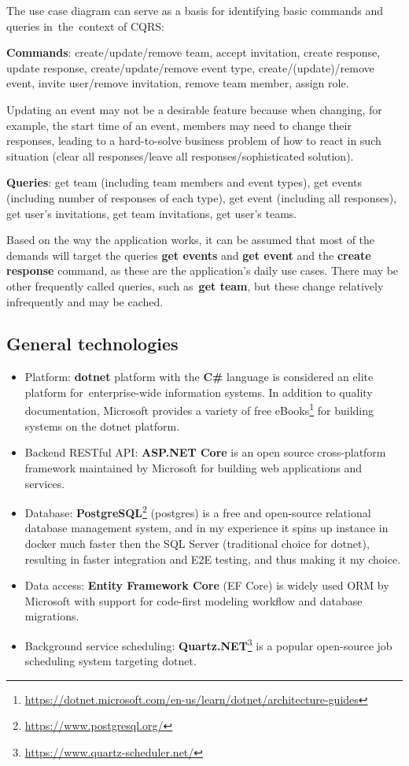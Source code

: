 The use case diagram can serve as a basis for identifying basic commands and queries in~the~context of CQRS:

\textbf{Commands}: create/update/remove team, accept invitation, create response, update response, create/update/remove event type, create/(update)/remove event, invite user/remove invitation, remove team member, assign role.

Updating an event may not be a desirable feature because when changing, for example, the start time of an event, members may need to change their responses, leading to a hard-to-solve business problem of how to react in such situation (clear all responses/leave all responses/sophisticated solution).

\textbf{Queries}: get team (including team members and event types), get events (including number of responses of each type), get event (including all responses), get user's invitations, get team invitations, get user's teams.

Based on the way the application works, it can be assumed that most of the demands will target the queries \textbf{get events} and \textbf{get event} and the \textbf{create response} command, as these are the application's daily use cases. There may be other frequently called queries, such as~\textbf{get team}, but these change relatively infrequently and may be cached.

\subsection{General technologies}
\begin{itemize}
    \item Platform: \textbf{dotnet} platform with the \textbf{C\#} language is considered an elite platform for~enterprise-wide information systems. In addition to quality documentation, Microsoft provides a variety of free eBooks\footnote{\url{https://dotnet.microsoft.com/en-us/learn/dotnet/architecture-guides}} for building systems on the dotnet platform.
    
    \item Backend RESTful API: \textbf{ASP.NET Core} is an open source cross-platform framework maintained by Microsoft for building web applications and services.
    
    \item Database: \textbf{PostgreSQL}\footnote{\url{https://www.postgresql.org/}} (postgres) is a free and open-source relational database management system, and in my experience it spins up instance in docker much faster then the SQL Server (traditional choice for dotnet), resulting in faster integration and E2E testing, and thus making it my choice.
    
    \item Data access: \textbf{Entity Framework Core} (EF Core) is widely used ORM by Microsoft with support for code-first modeling workflow and database migrations.
    
    \item Background service scheduling: \textbf{Quartz.NET}\footnote{\url{https://www.quartz-scheduler.net/}} is a popular open-source job scheduling system targeting dotnet.
\end{itemize}

